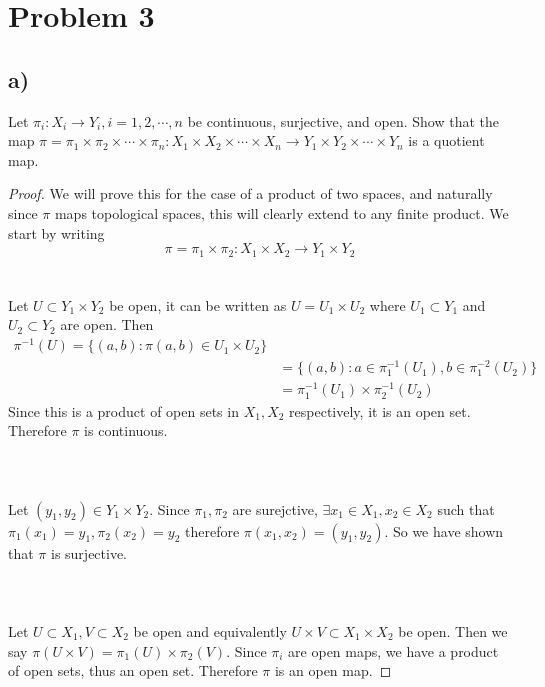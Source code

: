 \documentclass{article}
\theoremstyle{definition}
\begin{document}
\section*{Problem 3}
\subsection*{a)}
\begin{mdframed}
    Let $\pi_i: X_i \rightarrow Y_i, i = 1,2,\cdots,n$ be continuous, surjective, and open.
    Show that the map $\pi = \pi_1 \times \pi_2 \times \cdots \times \pi_n : X_1 \times X_2 \times \cdots \times X_n \rightarrow Y_1 \times Y_2 \times \cdots \times Y_n$
    is a quotient map.
\end{mdframed}
\begin{proof}
    We will prove this for the case of a product of two spaces, and naturally since $\pi$ maps topological spaces,
    this will clearly extend to any finite product.
    We start by writing 
    \[
        \pi = \pi_1 \times \pi_2 : X_1 \times X_2 \rightarrow Y_1 \times Y_2
    \]
    \\\\
    Let $U \subset Y_1 \times Y_2$ be open, it can be written as $U = U_1 \times U_2$ where $U_1 \subset Y_1$ and $U_2 \subset Y_2$ are open.
    Then 
    \begin{align*}
        \pi^{-1}(U) = \{(a,b) : \pi(a,b) \in U_1 \times U_2 \}\\
        &=\{(a,b) : a\in \pi_1^{-1}(U_1), b \in \pi_1^{-2}(U_2)\}\\
        &=\pi_1^{-1}(U_1) \times \pi_2^{-1}(U_2)
    \end{align*}
    Since this is a product of open sets in $X_1, X_2$ respectively, it is an open set. Therefore $\pi$ is continuous.
    \\\\
    \\\\
    Let $(y_1, y_2) \in Y_1 \times Y_2$. Since $\pi_1, \pi_2$ are surejctive, $\exists x_1\in X_1, x_2 \in X_2$ such that 
    $\pi_1(x_1) = y_1, \pi_2(x_2) = y_2$ therefore $\pi(x_1, x_2) = (y_1,y_2)$. So we have shown that $\pi$ is surjective.\\\\
    \\\\
    Let $U \subset X_1, V \subset X_2$ be open and equivalently $U \times V \subset X_1 \times X_2$ be open.
    Then we say $\pi(U \times V) = \pi_1(U) \times \pi_2(V)$. Since $\pi_i$ are open maps, we have a product of open sets, thus an open set.
    Therefore $\pi$ is an open map.
\end{proof}
\end{document}
